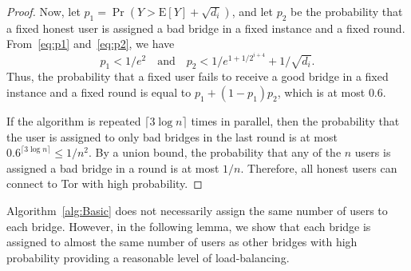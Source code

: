 \documentclass{sig-alternate-05-2015}
\newcommand{\E}{\mathbf{\mathrm{E}}}
\begin{document}
\begin{proof}
	Now, let ${p_1 = \Pr(Y > \E[Y] + \sqrt{d_i})}$, and let $p_2$ be the probability that a fixed honest user is assigned a bad bridge in a fixed instance and a fixed round. From~\eqref{eq:p1} and~\eqref{eq:p2}, we have
	\[p_1 < 1/e^2 \quad \text{and} \quad p_2 < 1/e^{1+1/2^{i+4}} + 1/\sqrt{d_i}.\]
	Thus, the probability that a fixed user fails to receive a good bridge in a fixed instance and a fixed round is equal to ${p_1 + (1-p_1)p_2}$, which is at most $0.6$.
	
	If the algorithm is repeated ${\lceil 3\log{n} \rceil}$ times in parallel, then the probability that the user is assigned to only bad bridges in the last round is at most ${0.6^{\lceil 3\log{n} \rceil} \leq 1/n^2}$.
	By a union bound, the probability that any of the $n$ users is assigned a bad bridge in a round is at most $1/n$. 
	Therefore, all honest users can connect to Tor with high probability.
\end{proof}


Algorithm~\ref{alg:Basic} does not necessarily assign the same number of users to each bridge. However, in the following lemma, we show that each bridge is assigned to almost the same number of users as other bridges with high probability providing a reasonable level of load-balancing.
\end{document}
